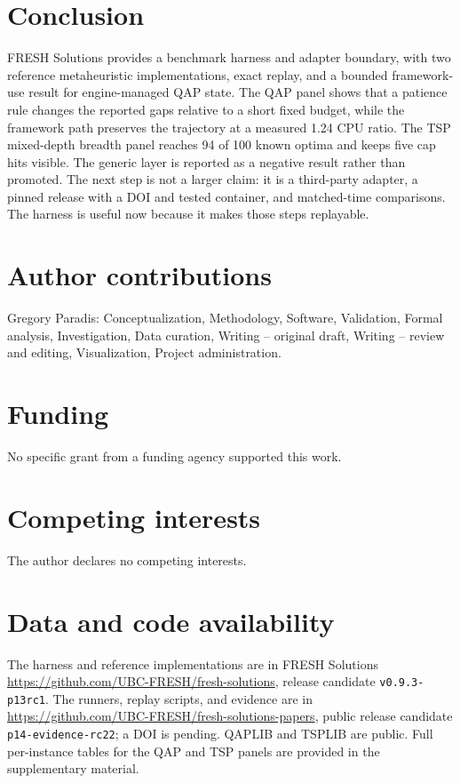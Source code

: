 \documentclass[10pt]{article}
\begin{document}
\section{Conclusion}

FRESH Solutions provides a benchmark harness and adapter boundary, with two reference
metaheuristic implementations, exact replay, and a bounded framework-use result for engine-managed
QAP state. The QAP panel shows that a patience rule changes the reported gaps relative to a short
fixed budget, while the framework path preserves the trajectory at a measured 1.24 CPU ratio. The
TSP mixed-depth breadth panel reaches 94 of 100 known optima and keeps five cap hits visible. The generic layer
is reported as a negative result rather than promoted. The next step is not a larger claim: it is a
third-party adapter, a pinned release with a DOI and tested container, and matched-time comparisons.
The harness is useful now because it makes those steps replayable.

\section*{Author contributions}

Gregory Paradis: Conceptualization, Methodology, Software, Validation, Formal analysis, Investigation,
Data curation, Writing -- original draft, Writing -- review and editing, Visualization, Project
administration.

\section*{Funding}

No specific grant from a funding agency supported this work.

\section*{Competing interests}

The author declares no competing interests.

\section*{Data and code availability}
The harness and reference implementations are in FRESH Solutions
\url{https://github.com/UBC-FRESH/fresh-solutions}, release candidate
\texttt{v0.9.3-p13rc1}. The runners, replay scripts, and evidence are in
\url{https://github.com/UBC-FRESH/fresh-solutions-papers}, public release candidate
\texttt{p14-evidence-rc22}; a DOI is pending. QAPLIB and TSPLIB are public.
Full per-instance tables for the QAP and TSP panels are provided in the
supplementary material.



\end{document}
